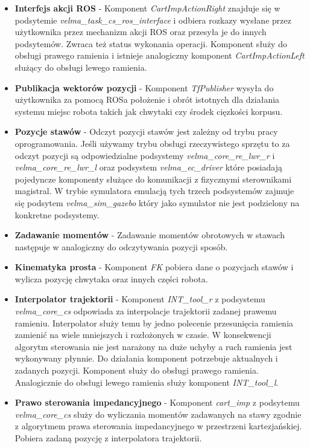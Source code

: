 	\begin{itemize}
	\item \textbf{Interfejs akcji ROS} - 
	Komponent \textit{CartImpActionRight} znajduje się w podsytemie \textit{velma\_task\_cs\_ros\_interface} i odbiera rozkazy wysłane przez użytkownika przez mechanizm akcji ROS oraz przesyła je do innych podsytemów. Zwraca też status wykonania operacji. Komponent służy do obsługi prawego ramienia i istnieje analogiczny komponent \textit{CartImpActionLeft} służący do obsługi lewego ramienia.
	\item \textbf{Publikacja wektorów pozycji} - 
	Komponent \textit{TfPublisher} wysyła do użytkownika za pomocą ROSa położenie i obrót istotnych dla działania systemu miejsc robota takich jak chwytaki czy środek cięzkości korpusu. 
	\item \textbf{Pozycje stawów} - 
	Odczyt pozycji stawów jest zależny od trybu pracy oprogramowania. Jeśli używamy trybu obsługi rzeczywistego sprzętu to za odczyt pozycji są odpowiedzialne podsystemy \textit{velma\_core\_re\_lwr\_r} i \textit{velma\_core\_re\_lwr\_l} oraz podsystem \textit{velma\_ec\_driver} które posiadają pojedyncze komponenty służące do komunikacji z fizycznymi sterownikami magistral. W trybie symulatora emulacją tych trzech podsystemów zajmuje się podsytem \textit{velma\_sim\_gazebo} który jako symulator nie jest podzielony na konkretne podsystemy.
	\item \textbf{Zadawanie momentów} - 
	Zadawanie momentów obrotowych w stawach następuje w analogiczny do odczytywania pozycji sposób.
	\item \textbf{Kinematyka prosta} - 
	Komponent \textit{FK} pobiera dane o pozycjach stawów i wylicza pozycję chwytaka oraz innych części robota.
	\item \textbf{Interpolator trajektorii} - 
	Komponent \textit{INT\_tool\_r} z podsystemu \textit{velma\_core\_cs} odpowiada za interpolacje trajektorii zadanej prawemu ramieniu. Interpolator służy temu by jedno polecenie przesunięcia ramienia zamienić na wiele mniejszych i rozłożonych w czasie. W konsekwencji algorytm sterowania nie jest narażony na duże uchyby a ruch ramienia jest wykonywany płynnie. Do działania komponent potrzebuje aktualnych i zadanych pozycji. Komponent służy do obsługi prawego ramienia. Analogicznie do obsługi lewego ramienia służy komponent \textit{INT\_tool\_l}.

	\item \textbf{Prawo sterowania impedancyjnego} - 
	Komponent \textit{cart\_imp} z podsytemu \textit{velma\_core\_cs} służy do wyliczania momentów zadawanych na stawy zgodnie z algorytmem prawa sterowania impedancyjnego w przestrzeni kartezjańskiej. Pobiera zadaną pozycję z interpolatora trajektorii.
	\end{itemize}